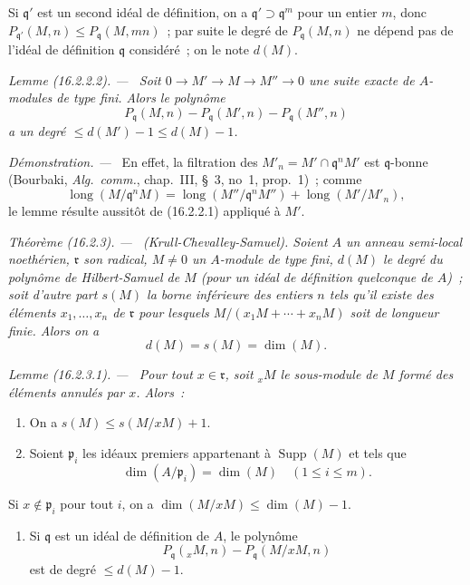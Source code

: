 \documentclass[10pt,oneside]{book}
\makeatletter
\newcommand{\setmanualcurrentlabel}[1]{\def\@currentlabel{#1}}
\newenvironment{theorem}[1][]{%
  \setmanualcurrentlabel{#1}\par\medskip\noindent\itshape Théorème (#1). ---\ }{\par}
\newenvironment{lemma}[1][]{%
  \setmanualcurrentlabel{#1}\par\medskip\noindent\itshape Lemme (#1). ---\ }{\par}
\newenvironment{proof}{%
  \par\medskip\noindent\textit{Démonstration. ---\ }}{\par}
\makeatother
\begin{document}
Si $\mathfrak{q}'$ est un second idéal de définition, on a
$\mathfrak{q}'\supset\mathfrak{q}^m$ pour un entier $m$, donc
$P_{\mathfrak{q}'}(M,n)\leq P_{\mathfrak{q}}(M,mn)$~; par suite le degré de
$P_{\mathfrak{q}}(M,n)$ ne dépend pas de l'idéal de définition
$\mathfrak{q}$ considéré~; on le note $d(M)$.

\begin{lemma}[16.2.2.2]
\label{0.16.2.2.2-fr}
Soit $0\to M'\to M\to M''\to0$ une suite exacte de $A$-modules de type
fini. Alors le polynôme
\[
  P_{\mathfrak{q}}(M,n)-P_{\mathfrak{q}}(M',n)
  -P_{\mathfrak{q}}(M'',n)
\]
a un degré $\leq d(M')-1\leq d(M)-1$.
\end{lemma}

\begin{proof}
En effet, la filtration des
$M'_n=M'\cap\mathfrak{q}^nM'$ est $\mathfrak{q}$-bonne (Bourbaki,
\emph{Alg.~comm.}, chap.~III, \S~3, no~1, prop.~1)~; comme
\[
  \operatorname{long}(M/\mathfrak{q}^nM)
  =\operatorname{long}(M''/\mathfrak{q}^nM'')
  +\operatorname{long}(M'/M'_n),
\]
le lemme résulte aussitôt de (16.2.2.1) appliqué à $M'$.
\end{proof}

\begin{theorem}[16.2.3]
\label{0.16.2.3-fr}
\textup{(Krull-Chevalley-Samuel).}
Soient $A$ un anneau semi-local noethérien, $\mathfrak{r}$ son radical,
$M\neq0$ un $A$-module de type fini, $d(M)$ le degré du polynôme de
Hilbert-Samuel de $M$ (pour un idéal de définition quelconque de $A$)~; soit
d'autre part $s(M)$ la borne inférieure des entiers $n$ tels qu'il existe des
éléments $x_1,\ldots,x_n$ de $\mathfrak{r}$ pour lesquels
$M/(x_1M+\cdots+x_nM)$ soit de longueur finie. Alors on a
\[
  d(M)=s(M)=\dim(M).
\]
\end{theorem}

\begin{lemma}[16.2.3.1]
\label{0.16.2.3.1-fr}
Pour tout $x\in\mathfrak{r}$, soit ${}_xM$ le sous-module de $M$ formé des
éléments annulés par $x$. Alors~:
\begin{enumerate}
  \item[\rm{(i)}] On a $s(M)\leq s(M/xM)+1$.
  \item[\rm{(ii)}] Soient $\mathfrak{p}_i$ les idéaux premiers appartenant à
  $\operatorname{Supp}(M)$ et tels que
  \[
    \dim(A/\mathfrak{p}_i)=\dim(M)\quad(1\leq i\leq m).
  \]
\end{enumerate}
Si $x\notin\mathfrak{p}_i$ pour tout $i$, on a
$\dim(M/xM)\leq\dim(M)-1$.
\begin{enumerate}
  \item[\rm{(iii)}] Si $\mathfrak{q}$ est un idéal de définition de $A$, le
  polynôme
  \[
    P_{\mathfrak{q}}({}_xM,n)-P_{\mathfrak{q}}(M/xM,n)
  \]
  est de degré $\leq d(M)-1$.
\end{enumerate}
\end{lemma}
\end{document}
